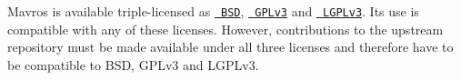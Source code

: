 Mavros is available triple-\/licensed as \href{https://github.com/mavlink/mavros/blob/master/LICENSE-BSD.txt}{\texttt{ B\+SD}}, \href{https://www.gnu.org/licenses/gpl.html}{\texttt{ G\+P\+Lv3}} and \href{https://www.gnu.org/licenses/lgpl.html}{\texttt{ L\+G\+P\+Lv3}}. Its use is compatible with any of these licenses. However, contributions to the upstream repository must be made available under all three licenses and therefore have to be compatible to B\+SD, G\+P\+Lv3 and L\+G\+P\+Lv3. 